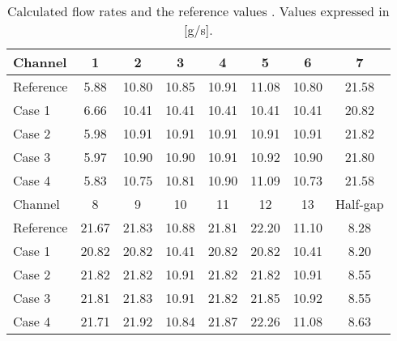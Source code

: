 \begin{table}[htbp!]
  \centering
  \caption{Calculated flow rates and the reference values \cite{sato_computational_2010}. Values expressed in [g/s].}
  \label{tab:th-assem-flow-massflow}
  \begin{tabular}{l|ccccccc}
\toprule
Channel & 1 & 2 & 3 & 4 & 5 & 6 & 7 \\
\midrule
Reference  & 5.88 & 10.80 & 10.85 & 10.91 & 11.08 & 10.80 & 21.58 \\
Case 1  & 6.66 & 10.41 & 10.41 & 10.41 & 10.41 & 10.41 & 20.82 \\
Case 2  & 5.98 & 10.91 & 10.91 & 10.91 & 10.91 & 10.91 & 21.82 \\
Case 3  & 5.97 & 10.90 & 10.90 & 10.91 & 10.92 & 10.90 & 21.80 \\
Case 4  & 5.83 & 10.75 & 10.81 & 10.90 & 11.09 & 10.73 & 21.58 \\
\midrule
Channel & 8 & 9 & 10 & 11 & 12 & 13 & Half-gap \\
\midrule
Reference  & 21.67 & 21.83 & 10.88 & 21.81 & 22.20 & 11.10 & 8.28 \\
Case 1  & 20.82 & 20.82 & 10.41 & 20.82 & 20.82 & 10.41 & 8.20 \\
Case 2  & 21.82 & 21.82 & 10.91 & 21.82 & 21.82 & 10.91 & 8.55 \\
Case 3  & 21.81 & 21.83 & 10.91 & 21.82 & 21.85 & 10.92 & 8.55 \\
Case 4  & 21.71 & 21.92 & 10.84 & 21.87 & 22.26 & 11.08 & 8.63 \\
\bottomrule
\end{tabular}
\end{table}

